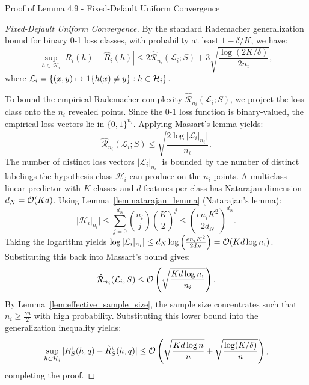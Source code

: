 \begin{sourceblock}{Proof of Lemma 4.9 - Fixed-Default Uniform Convergence}
\begin{proof}[Fixed-Default Uniform Convergence]
By the standard Rademacher generalization bound for binary 0-1 loss classes, with probability at least $1 - \delta/K$, we have:
\begin{equation}
    \sup_{h \in \mathcal{H}_i} |R_i(h) - \hat{R}_i(h)| \le 2\hat{\mathcal{R}}_{n_i}(\mathcal{L}_i; S) + 3\sqrt{\frac{\log(2K/\delta)}{2n_i}},
\end{equation}
where $\mathcal{L}_i = \{(x, y) \mapsto \mathbf{1}\{h(x) \ne y\} : h \in \mathcal{H}_i\}$.

To bound the empirical Rademacher complexity $\hat{\mathcal{R}}_{n_i}(\mathcal{L}_i; S)$, we project the loss class onto the $n_i$ revealed points. Since the 0-1 loss function is binary-valued, the empirical loss vectors lie in $\{0, 1\}^{n_i}$. Applying Massart's lemma yields:
\begin{equation}
    \hat{\mathcal{R}}_{n_i}(\mathcal{L}_i; S) \le \sqrt{\frac{2\log|\mathcal{L}_i|_{n_i}|}{n_i}}.
\end{equation}
The number of distinct loss vectors $|\mathcal{L}_i|_{n_i}|$ is bounded by the number of distinct labelings the hypothesis class $\mathcal{H}_i$ can produce on the $n_i$ points. A multiclass linear predictor with $K$ classes and $d$ features per class has Natarajan dimension $d_N = \mathcal{O}(K d)$. Using Lemma~\ref{lem:natarajan_lemma} (Natarajan's lemma):
\begin{equation}
    |\mathcal{H}_i|_{n_i}| \le \sum_{j=0}^{d_N} \binom{n_i}{j}\binom{K}{2}^j \le \left( \frac{e n_i K^2}{2d_N} \right)^{d_N}.
\end{equation}
Taking the logarithm yields $\log |\mathcal{L}_i|_{n_i}| \le d_N \log\left( \frac{e n_i K^2}{2d_N} \right) = \mathcal{O}(K d \log n_i)$. Substituting this back into Massart's bound gives:
\begin{equation}
    \hat{\mathcal{R}}_{n_i}(\mathcal{L}_i; S) \le \mathcal{O}\left( \sqrt{\frac{K d \log n_i}{n_i}} \right).
\end{equation}
By Lemma~\ref{lem:effective_sample_size}, the sample size concentrates such that $n_i \ge \frac{\gamma n}{2}$ with high probability. Substituting this lower bound into the generalization inequality yields:
\begin{equation}
    \sup_{h \in \mathcal{H}_i} |R^i_S(h, q) - \hat{R}^i_S(h, q)| \le \mathcal{O}\left( \sqrt{\frac{K d \log n}{n}} + \sqrt{\frac{\log(K/\delta)}{n}} \right),
\end{equation}
completing the proof.
\end{proof}
\end{sourceblock}

